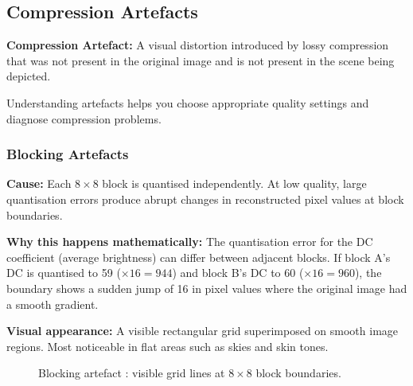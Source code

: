 \subsection{Compression Artefacts}

\begin{definitionbox}
\textbf{Compression Artefact:} A visual distortion introduced by lossy compression that was not present in the original image and is not present in the scene being depicted.
\end{definitionbox}

Understanding artefacts helps you choose appropriate quality settings and diagnose compression problems.

\subsubsection{Blocking Artefacts}

\textbf{Cause:} Each $8\times8$ block is quantised independently. At low quality, large quantisation errors produce abrupt changes in reconstructed pixel values at block boundaries.

\textbf{Why this happens mathematically:} The quantisation error for the DC coefficient (average brightness) can differ between adjacent blocks. If block A's DC is quantised to 59 ($\times16=944$) and block B's DC to 60 ($\times16=960$), the boundary shows a sudden jump of 16 in pixel values where the original image had a smooth gradient.

\textbf{Visual appearance:} A visible rectangular grid superimposed on smooth image regions. Most noticeable in flat areas such as skies and skin tones.

\begin{figure}[H]
\centering
{}
\caption{Blocking artefact : visible grid lines at $8\times8$ block boundaries.}
\label{fig:blocking}
\end{figure}

